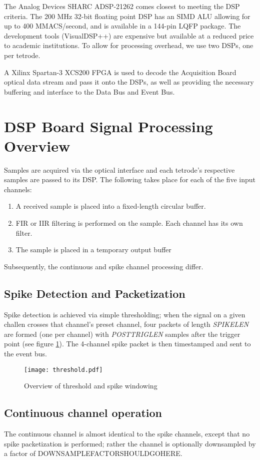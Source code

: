 The Analog Devices SHARC ADSP-21262 comes closest to meeting
the DSP criteria. The 200 MHz 32-bit floating point DSP has an SIMD
ALU allowing for up to 400 MMACS/second, and is available in a 144-pin
LQFP package. The development tools (VisualDSP++) are expensive but
available at a reduced price to academic institutions. To allow for
processing overhead, we use two DSPs, one per tetrode.  
      
A Xilinx Spartan-3 XCS200 FPGA is used to decode the Acquisition Board
optical data stream and pass it onto the DSPs, as well as providing
the necessary buffering and interface to the Data Bus and Event Bus.
      

\section{DSP Board Signal Processing Overview}

Samples are acquired via the optical interface and each tetrode's respective samples are passed to its DSP. The following takes place for each of the five input channels:
\begin{enumerate}
\item A received sample is placed into a fixed-length circular buffer. 
\item FIR or IIR filtering is performed on the sample. Each channel has its own filter. 
\item The sample is placed in a temporary output buffer
\end{enumerate}

Subsequently, the continuous and spike channel processing differ. 

\subsection{Spike Detection and Packetization}

Spike detection is achieved via simple thresholding; when the signal on a given challen crosses that channel's preset channel, four packets of length \textit{SPIKELEN} are formed (one per channel) with \textit{POSTTRIGLEN} samples after the trigger point (see figure \ref{threshold}). The 4-channel spike packet is then timestamped and sent to the event bus. 


\begin{figure}
\texttt{[image: threshold.pdf]}
\caption{Overview of threshold and spike windowing}
\label{threshold}
\end{figure}

\subsection{Continuous channel operation}
The continuous channel is almost identical to the spike channels, except that no spike packetization is performed; rather the channel is optionally downsampled by a factor of DOWNSAMPLEFACTORSHOULDGOHERE. 
